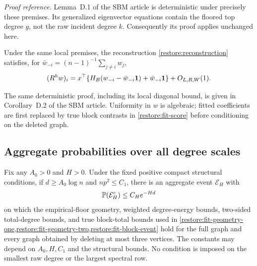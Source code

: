 \noindent\emph{Proof reference.}
Lemma~D.1 of the SBM article is deterministic
under precisely these premises. Its generalized eigenvector equations
contain the floored top degree $g$, not the raw incident degree $k$.
Consequently its proof applies unchanged here.

\begin{corollary}\label{restore:loo-corrected}
Under the same local premises, the reconstruction
\eqref{restore:reconstruction} satisfies, for
$\bar w_{-i}=(n-1)^{-1}\sum_{j\ne i}w_j$,
\begin{equation}\label{restore:loo-corrected-action}
 (R^h w)_i=x^\top\{H_B(w_{-i}-\bar w_{-i}\mathbf 1)
                        +\bar w_{-i}\mathbf 1\}+O_{L,R,W}(1).
\end{equation}
\end{corollary}
The same deterministic proof, including its local diagonal bound,
is given in Corollary~D.2 of the SBM article. Uniformity in $w$ is algebraic; fitted
coefficients are first replaced by true block contrasts in
\cref{restore:fit-score} before conditioning on the deleted graph.

\subsection{Aggregate probabilities over all degree scales}
\begin{lemma}
\label{restore:high-aggregate}
Fix any $A_0>0$ and $H>0$. Under the fixed positive compact structural
conditions, if $d\ge A_0\log n$ and $np^2\le C_1$, there is an aggregate
event $\mathcal E_H$ with
\[
 \mathbb P(\mathcal E_H^c)\le C_H e^{-Hd}
\]
on which the empirical-floor geometry, weighted degree-energy bounds,
two-sided total-degree bounds, and true block-total bounds used in
\cref{restore:fit-geometry-one,restore:fit-geometry-two,restore:fit-block-event}
hold for the full graph and every graph obtained by deleting at most three
vertices. The constants may depend on $A_0,H,C_1$ and the structural
bounds. No condition is imposed on the smallest raw degree or the
largest spectral row.
\end{lemma}


